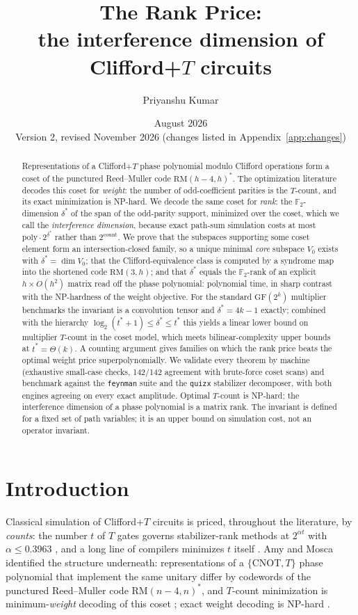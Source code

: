 \documentclass[11pt]{article}
\title{\textbf{The Rank Price:}\\[2pt]\large the interference dimension of Clifford+$T$ circuits}
\author{Priyanshu Kumar}
\date{August 2026\\[2pt]\small Version 2, revised November 2026 (changes listed in Appendix~\ref{app:changes})}
\theoremstyle{definition}
\theoremstyle{remark}
\newcommand{\F}{\mathbb{F}_2}
\newcommand{\RM}{\mathrm{RM}}
\newcommand{\ds}{\delta^{*}}
\newcommand{\ts}{t^{*}}
\newcommand{\code}[1]{\texttt{#1}}
\begin{document}
\maketitle

\begin{abstract}
\noindent
Representations of a Clifford+$T$ phase polynomial modulo Clifford operations form a
coset of the punctured Reed--Muller code $\RM(h-4,h)^{*}$. The optimization literature decodes
this coset for \emph{weight}: the number of odd-coefficient parities is the $T$-count, and its exact
minimization is NP-hard. We decode the same coset for \emph{rank}: the $\F$-dimension $\ds$ of the
span of the odd-parity support, minimized over the coset, which we call the \emph{interference
dimension}, because exact path-sum simulation costs at most $\mathrm{poly}\cdot 2^{\ds}$ rather than
$2^{\mathrm{count}}$. We prove
that the subspaces supporting some coset element form an intersection-closed family, so
a unique minimal \emph{core} subspace $V_0$ exists with $\ds=\dim V_0$; that the Clifford-equivalence
class is computed by a syndrome map into the shortened code $\RM(3,h)$; and that $\ds$ equals
the $\F$-rank of an explicit $h\times O(h^2)$ matrix read off the phase polynomial: polynomial time, in sharp
contrast with the NP-hardness of the weight objective. For the standard $\mathrm{GF}(2^k)$ multiplier
benchmarks the invariant is a convolution tensor and $\ds=4k-1$ exactly; combined with the
hierarchy $\log_2(\ts+1)\le\ds\le\ts$ this yields a linear lower bound on multiplier $T$-count in the
coset model, which meets bilinear-complexity upper bounds at $\ts=\Theta(k)$. A counting argument
gives families on which the rank price beats the optimal weight price superpolynomially. We
validate every theorem by machine (exhaustive small-case checks, 142/142 agreement with
brute-force coset scans) and benchmark against the \code{feynman} suite and the \code{quizx} stabilizer
decomposer, with both engines agreeing on every exact amplitude. Optimal $T$-count is
NP-hard; the interference dimension of a phase polynomial is a matrix rank. The invariant is defined
for a fixed set of path variables; it is an upper bound on simulation cost, not an operator invariant.
\end{abstract}

\section{Introduction}

Classical simulation of Clifford+$T$ circuits is priced, throughout the literature, by \emph{counts}:
the number $t$ of $T$ gates governs stabilizer-rank methods at $2^{\alpha t}$ with $\alpha\le 0.3963$
\cite{BG16,QPG21,KvdW22,KvdWV22}, and a long line of compilers minimizes $t$ itself
\cite{AM19,HC19,Van24,dBBW20}. Amy and Mosca identified the structure underneath: representations of
a $\{\mathrm{CNOT},T\}$ phase polynomial that implement the same unitary differ by codewords of the
punctured Reed--Muller code $\RM(n-4,n)^{*}$, and $T$-count minimization is minimum-\emph{weight}
decoding of this coset \cite{AM19}; exact weight decoding is NP-hard \cite{vdWA23}.
\end{document}
